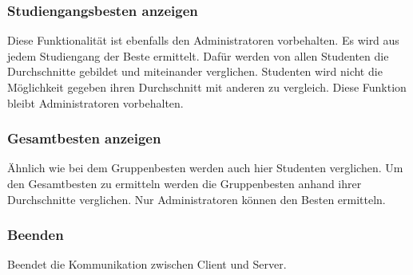 \documentclass{scrartcl}
\begin{document}
		\subsubsection{Studiengangsbesten anzeigen}
			Diese Funktionalität ist ebenfalls den Administratoren vorbehalten. Es wird aus jedem Studiengang der Beste ermittelt. Dafür werden von allen Studenten die Durchschnitte gebildet und miteinander verglichen. Studenten wird nicht die Möglichkeit gegeben ihren Durchschnitt mit anderen zu vergleich. Diese Funktion bleibt Administratoren vorbehalten.
		\subsubsection{Gesamtbesten anzeigen}
			Ähnlich wie bei dem Gruppenbesten werden auch hier Studenten verglichen. Um den Gesamtbesten zu ermitteln werden die Gruppenbesten anhand ihrer Durchschnitte verglichen. Nur Administratoren können den Besten ermitteln.
		\subsubsection{Beenden}
			Beendet die Kommunikation zwischen Client und Server. 
\end{document}
